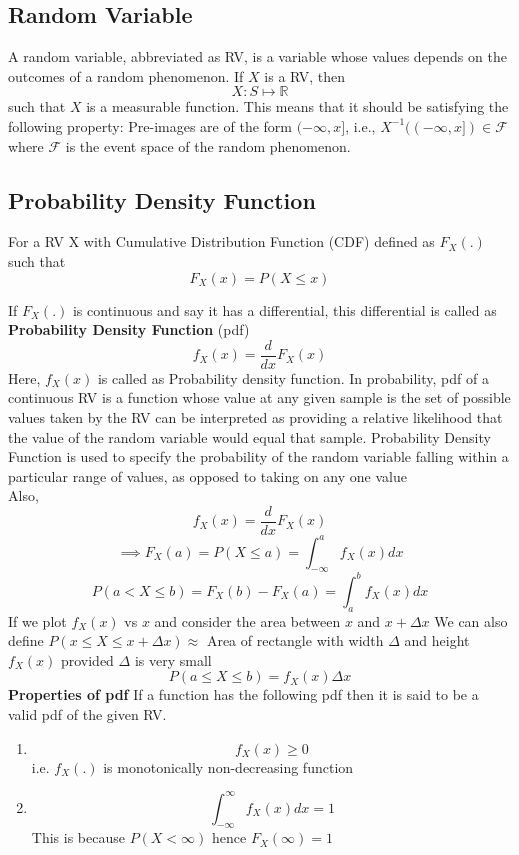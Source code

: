 \documentclass[10pt,twocolumn,letterpaper]{article}
\begin{document}

\subsection{Random Variable}
A random variable, abbreviated as RV, is a variable whose values depends on the outcomes of a random phenomenon. If $X$ is a RV, then $$X: S \mapsto \mathbb{R}$$ such that $X$ is a measurable function. This means that it should be satisfying the following property:
 Pre-images are of the form $(-\infty, x]$, i.e., $X^{-1}((-\infty, x]) \in \mathcal{F}$ where $\mathcal{F}$ is the event space of the random phenomenon. 


\subsection{Probability Density Function}
For a RV X with Cumulative Distribution Function (CDF) defined as $F_X(.)$ such that $$F_X(x) = P(X \leq x)$$

If $F_{X}(.)$ is continuous and say it has a differential, this differential is called as \textbf{Probability Density Function} (pdf) 
$$ f_{X}(x) = \frac{d}{dx}F_X(x)$$
Here, $f_{X}(x)$ is called as Probability density function. In probability, pdf of a continuous RV is a function whose value at any given sample is the set of possible values taken by the RV can be interpreted as providing a relative likelihood that the value of the random variable would equal that sample. Probability Density Function is used to specify the probability of the random variable falling within a particular range of values, as opposed to taking on any one value\\ 
Also,
$$ f_X(x) = \frac{d}{dx}F_X(x)$$
$$ \implies F_{X}(a) = P(X \leq a) = \int_{-\infty}^{a}f_{X}(x)dx$$
$$ P\left(a< X \leq b\right) = F_{X}(b) - F_{X}(a) = \int_{a}^{b}f_{X}(x)dx$$
If we plot $f_X(x)$ vs $x$ and consider the area between $x$ and $x+\Delta x$ We can also define
$P\left(x \leq X \leq x + \Delta x \right) \approx$ Area of rectangle with width $\Delta$ and height $f_{X}(x)$ provided $\Delta$ is very small
$$ P\left(a \leq X \leq b\right) = f_{X}(x) \Delta x $$
\textbf{Properties of pdf}
If a function has the following pdf then it is said to be a valid pdf of the given RV.
\begin{enumerate}
    \item $$f_X(x) \geq 0$$ i.e. $f_X(.)$ is monotonically non-decreasing function
    \item $$\int_{-\infty}^{\infty}f_X(x)dx = 1 $$ This is because $P(X<\infty)$ hence $F_X(\infty) = 1$
\end{enumerate}
\end{document}
